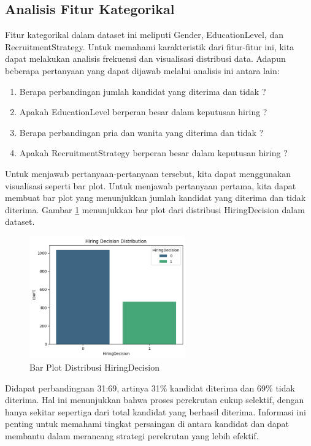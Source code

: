 \subsection{Analisis Fitur Kategorikal}
Fitur kategorikal dalam dataset ini meliputi Gender, EducationLevel, dan RecruitmentStrategy. Untuk memahami karakteristik dari fitur-fitur ini, kita dapat melakukan analisis frekuensi dan visualisasi distribusi data. Adapun beberapa pertanyaan yang dapat dijawab melalui analisis ini antara lain:

\begin{enumerate}
    \item Berapa perbandingan jumlah kandidat yang diterima dan tidak ?
    \item Apakah EducationLevel berperan besar dalam keputusan hiring ?
    \item Berapa perbandingan pria dan wanita yang diterima dan tidak ?
    \item Apakah RecruitmentStrategy berperan besar dalam keputusan hiring ?
\end{enumerate}

Untuk menjawab pertanyaan-pertanyaan tersebut, kita dapat menggunakan visualisasi seperti bar plot. Untuk menjawab pertanyaan pertama, kita dapat membuat bar plot yang menunjukkan jumlah kandidat yang diterima dan tidak diterima. Gambar \ref{fig:barplot1} menunjukkan bar plot dari distribusi HiringDecision dalam dataset.

\begin{figure}[H]
    \centering
    \includegraphics[width=0.6\textwidth]{gambar/barplot1.png}
    \caption{Bar Plot Distribusi HiringDecision}
    \label{fig:barplot1}
\end{figure}

Didapat perbandingnan 31:69, artinya 31\% kandidat diterima dan 69\% tidak diterima. Hal ini menunjukkan bahwa proses perekrutan cukup selektif, dengan hanya sekitar sepertiga dari total kandidat yang berhasil diterima. Informasi ini penting untuk memahami tingkat persaingan di antara kandidat dan dapat membantu dalam merancang strategi perekrutan yang lebih efektif.

